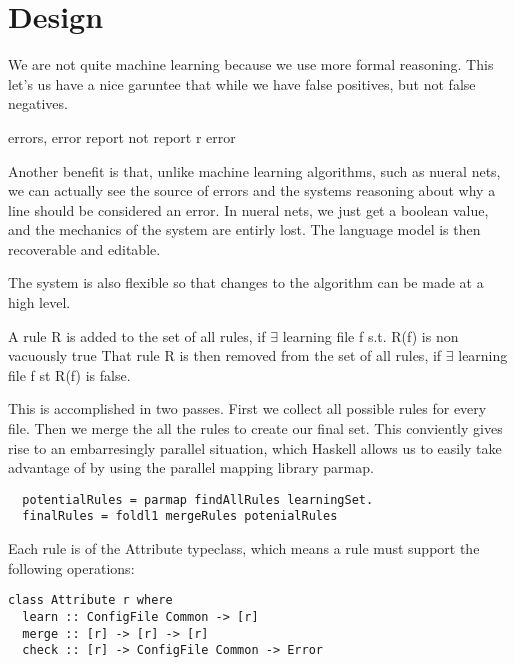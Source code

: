 
\section{\app Design}



We are not quite machine learning because we use more formal reasoning.
This let's us have a nice garuntee that while we have false positives, but not false negatives.

\forall errors, error \in report
not \forall report r \in error


Another benefit is that, unlike machine learning algorithms, such as nueral nets, we can actually see the source of errors and the systems reasoning about why a line should be considered an error.
In nueral nets, we just get a boolean value, and the mechanics of the system are entirly lost. 
The language model is then recoverable and editable.

The system is also flexible so that changes to the algorithm can be made at a high level.


A rule R is added to the set of all rules,
  if $\exists$ learning file f s.t. R(f) is non vacuously true
That rule R is then removed from the set of all rules,
  if $\exists$ learning file f st R(f) is false.

This is accomplished in two passes.
First we collect all possible rules for every file.
Then we merge the all the rules to create our final set.
This conviently gives rise to an embarresingly parallel situation, which Haskell allows us to easily take advantage of by
  using the parallel mapping library parmap.

\begin{lstlisting}
  potentialRules = parmap findAllRules learningSet.
  finalRules = foldl1 mergeRules potenialRules
\end{lstlisting}


Each rule is of the Attribute typeclass, which means a rule must support the following operations:
\begin{lstlisting}
class Attribute r where
  learn :: ConfigFile Common -> [r]
  merge :: [r] -> [r] -> [r] 
  check :: [r] -> ConfigFile Common -> Error
\end{lstlisting} 


